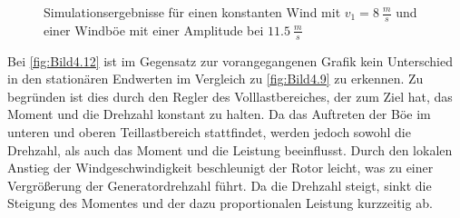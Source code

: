 \begin{figure}[H]
   \centering
   \caption[Windböensimulation bei langsamem Wind]{Simulationsergebnisse für einen konstanten Wind mit $v_1 = \SI{8}{\frac{m}{s}}$ und einer Windböe mit einer Amplitude bei $\SI{11.5}{\frac{m}{s}}$}
   \label{fig:Bild4.11}
\end{figure}

Bei \autoref{fig:Bild4.12} ist im Gegensatz zur vorangegangenen Grafik kein Unterschied in den stationären Endwerten im Vergleich zu \autoref{fig:Bild4.9} zu erkennen. Zu begründen ist dies durch den Regler des Volllastbereiches, der zum Ziel hat, das Moment und die Drehzahl konstant zu halten. Da das Auftreten der Böe im unteren und oberen Teillastbereich stattfindet, werden jedoch sowohl die Drehzahl, als auch das Moment und die Leistung beeinflusst. Durch den lokalen Anstieg der Windgeschwindigkeit beschleunigt der Rotor leicht, was zu einer Vergrößerung der Generatordrehzahl führt. Da die Drehzahl steigt, sinkt die Steigung des Momentes und der dazu proportionalen Leistung kurzzeitig ab.

